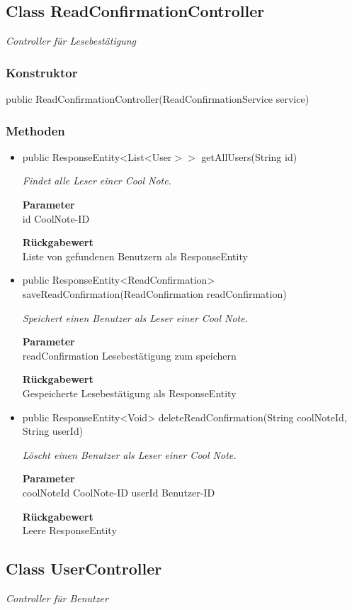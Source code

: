 \documentclass[a4paper]{scrreprt}
\begin{document}
    \subsection{Class ReadConfirmationController}
    \textit{Controller für Lesebestätigung}
    \subsubsection{Konstruktor}
    public ReadConfirmationController(ReadConfirmationService service)
    \subsubsection{Methoden}
    \begin{itemize}
    	\item{public ResponseEntity<List<User$>>$ getAllUsers(String id)}
    	
    	\textit{Findet alle Leser einer Cool Note.}
    	
    	\textbf{Parameter} \\
    	id CoolNote-ID
    	
    	\textbf{Rückgabewert} \\
    	Liste von gefundenen Benutzern als ResponseEntity        \item{public ResponseEntity<ReadConfirmation> saveReadConfirmation(ReadConfirmation readConfirmation)}
    	
    	\textit{Speichert einen Benutzer als Leser einer Cool Note.}
    	
    	\textbf{Parameter} \\
    	readConfirmation Lesebestätigung zum speichern
    	
    	\textbf{Rückgabewert} \\
    	Gespeicherte Lesebestätigung als ResponseEntity        \item{public ResponseEntity<Void> deleteReadConfirmation(String coolNoteId, String userId)}
    	
    	\textit{Löscht einen Benutzer als Leser einer Cool Note.}
    	
    	\textbf{Parameter} \\
    	coolNoteId CoolNote-ID
    	userId Benutzer-ID
    	
    	\textbf{Rückgabewert} \\
    	Leere ResponseEntity
    \end{itemize}
    \subsection{Class UserController}
    \textit{Controller für Benutzer}
\end{document}
